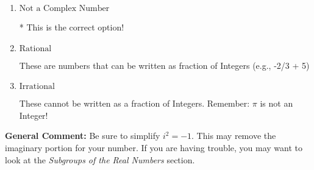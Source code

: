 \documentclass{extbook}[14pt]
\begin{document}
\begin{enumerate}
{\begin{enumerate}[label=\Alph*.]
This is a Complex number $(a+bi)$ that is not Real (has $i$ as part of the number).
\item \( \text{Not a Complex Number} \)

* This is the correct option!
\item \( \text{Rational} \)

These are numbers that can be written as fraction of Integers (e.g., -2/3 + 5)
\item \( \text{Irrational} \)

These cannot be written as a fraction of Integers. Remember: $\pi$ is not an Integer!
\end{enumerate}

\textbf{General Comment:} Be sure to simplify $i^2 = -1$. This may remove the imaginary portion for your number. If you are having trouble, you may want to look at the \textit{Subgroups of the Real Numbers} section.
}
\end{enumerate}
\end{document}
